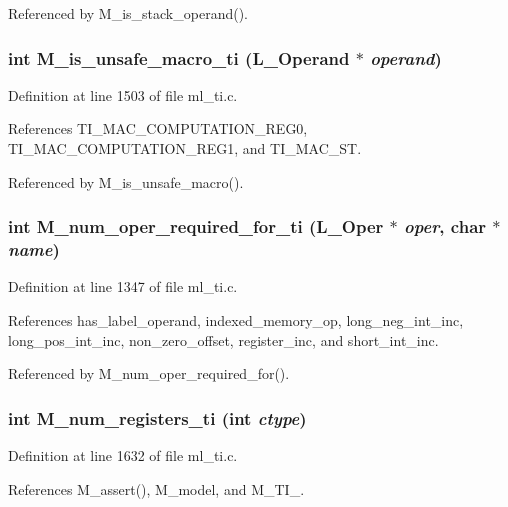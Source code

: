 Referenced by M\_\-is\_\-stack\_\-operand().
\subsubsection{\setlength{\rightskip}{0pt plus 5cm}int M\_\-is\_\-unsafe\_\-macro\_\-ti (L\_\-Operand $\ast$ {\em operand})}\label{ml__ti_8c_cde805290046ff9cf301676d1135f0f0}




Definition at line 1503 of file ml\_\-ti.c.

References TI\_\-MAC\_\-COMPUTATION\_\-REG0, TI\_\-MAC\_\-COMPUTATION\_\-REG1, and TI\_\-MAC\_\-ST.

Referenced by M\_\-is\_\-unsafe\_\-macro().
\subsubsection{\setlength{\rightskip}{0pt plus 5cm}int M\_\-num\_\-oper\_\-required\_\-for\_\-ti (L\_\-Oper $\ast$ {\em oper}, char $\ast$ {\em name})}\label{ml__ti_8c_4a5fa948fab23585d5b9dc74e4e4d5e3}




Definition at line 1347 of file ml\_\-ti.c.

References has\_\-label\_\-operand, indexed\_\-memory\_\-op, long\_\-neg\_\-int\_\-inc, long\_\-pos\_\-int\_\-inc, non\_\-zero\_\-offset, register\_\-inc, and short\_\-int\_\-inc.

Referenced by M\_\-num\_\-oper\_\-required\_\-for().
\subsubsection{\setlength{\rightskip}{0pt plus 5cm}int M\_\-num\_\-registers\_\-ti (int {\em ctype})}\label{ml__ti_8c_c1ac51ff34bc864794d49f033c8efcd3}




Definition at line 1632 of file ml\_\-ti.c.

References M\_\-assert(), M\_\-model, and M\_\-TI\_.


